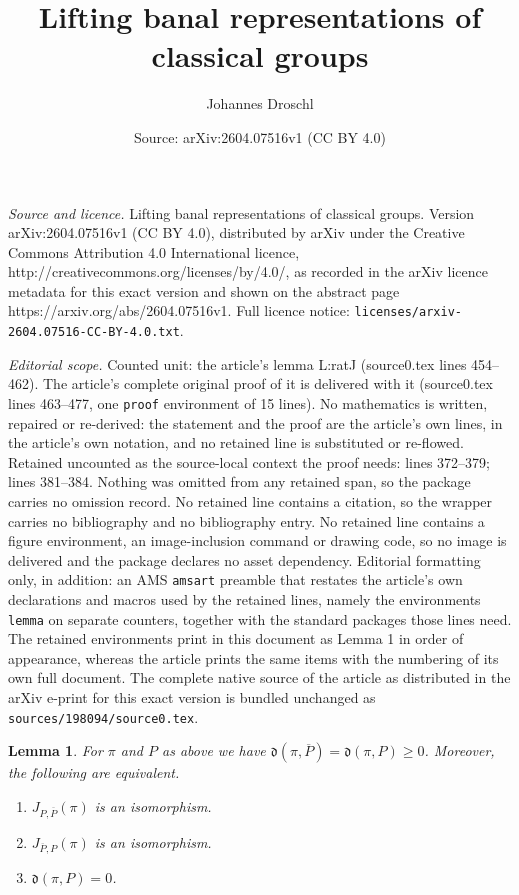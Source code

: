 \documentclass[10pt,a4paper]{amsart}
\title{Lifting banal representations of classical groups}
\author{Johannes Droschl}
\date{Source: arXiv:2604.07516v1 (CC BY 4.0)}
\newtheorem{lemma}{Lemma}
\newcommand{\op}{\overline{P}}
\newcommand{\pad}{\mathfrak{d}}
\begin{document}
\maketitle

\noindent\emph{Source and licence.} Lifting banal representations of classical groups. Version arXiv:2604.07516v1 (CC BY 4.0), distributed by arXiv under the Creative Commons Attribution 4.0 International licence, http://creativecommons.org/licenses/by/4.0/, as recorded in the arXiv licence metadata for this exact version and shown on the abstract page https://arxiv.org/abs/2604.07516v1. Full licence notice: \texttt{licenses/arxiv-2604.07516-CC-BY-4.0.txt}.\par\smallskip

\noindent\textit{Editorial scope.} Counted unit: the article's lemma L:ratJ (source0.tex lines 454--462). The article's complete original proof of it is delivered with it (source0.tex lines 463--477, one \texttt{proof} environment of 15 lines). No mathematics is written, repaired or re-derived: the statement and the proof are the article's own lines, in the article's own notation, and no retained line is substituted or re-flowed.  Retained uncounted as the source-local context the proof needs: lines 372--379; lines 381--384.  Nothing was omitted from any retained span, so the package carries no omission record.  No retained line contains a citation, so the wrapper carries no bibliography and no bibliography entry.  No retained line contains a figure environment, an image-inclusion command or drawing code, so no image is delivered and the package declares no asset dependency.  Editorial formatting only, in addition: an AMS \texttt{amsart} preamble that restates the article's own declarations and macros used by the retained lines, namely the environments \texttt{lemma} on separate counters, together with the standard packages those lines need.  The retained environments print in this document as Lemma 1 in order of appearance, whereas the article prints the same items with the numbering of its own full document.  The complete native source of the article as distributed in the arXiv e-print for this exact version is bundled unchanged as \texttt{sources/198094/source0.tex}.
\begin{lemma}\label{L:pder}
    For $\pi$ and $P$ as above we have $\pad(\pi,\op)=\pad(\pi,P)\ge 0$. Moreover, the following are equivalent.
    \begin{enumerate}
        \item $J_{P,\op}(\pi)$ is an isomorphism.
        \item $J_{\op,P}(\pi)$ is an isomorphism.
        \item $\pad(\pi,P)=0$.
    \end{enumerate}
\end{lemma}
\end{document}
